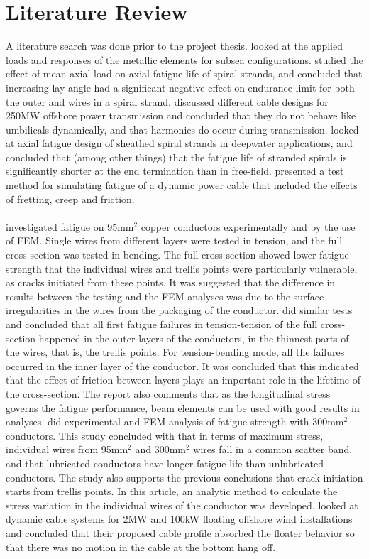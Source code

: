 \section{Literature Review}
A literature search was done prior to the project thesis. \cite{Feld1995} looked at the applied loads and responses of the metallic elements for subsea configurations. \cite{Alani1997Eoma} studied the effect of mean axial load on axial fatigue life of spiral strands, and concluded that increasing lay angle had a significant negative effect on endurance limit for both the outer and wires in a spiral strand. \cite{Chien2004} discussed different cable designs for 250MW offshore power transmission and concluded that they do not behave like umbilicals dynamically, and that harmonics do occur during transmission. \cite{Raoof2008} looked at axial fatigue design of sheathed spiral strands in deepwater applications, and concluded that (among other things) that the fatigue life of stranded spirals is significantly shorter at the end termination than in free-field. \cite{Karlsen2010} presented a test method for simulating fatigue of a dynamic power cable that included the effects of fretting, creep and friction.\\\\ \cite{Nasution2013} investigated fatigue on 95mm$^2$ copper conductors experimentally and by the use of FEM. Single wires from different layers were tested in tension, and the full cross-section was tested in bending. The full cross-section showed lower fatigue strength that the individual wires and trellis points were particularly vulnerable, as cracks initiated from these points. It was suggested that the difference in results between the testing and the FEM analyses was due to the surface irregularities in the wires from the packaging of the conductor. \cite{NASUTION2014} did similar tests and concluded that all first fatigue failures in tension-tension of the full cross-section happened in the outer layers of the conductors, in the thinnest parts of the wires, that is, the trellis points. For tension-bending mode, all the failures occurred in the inner layer of the conductor. It was concluded that this indicated that the effect of friction between layers plays an important role in the lifetime of the cross-section. The report also comments that as the longitudinal stress governs the fatigue performance, beam elements can be used with good results in analyses. \cite{s300} did experimental and FEM analysis of fatigue strength with 300mm$^2$ conductors. This study concluded with that in terms of maximum stress, individual wires from 95mm$^2$  and 300mm$^2$ wires fall in a common scatter band, and that lubricated conductors have longer fatigue life than unlubricated conductors. The study also supports the previous conclusions that crack initiation starts from trellis points. In this article, an analytic method to calculate the stress variation in the individual wires of the conductor was developed. \cite{Taninok2017} looked at dynamic cable systems for 2MW and 100kW floating offshore wind installations and concluded that their proposed cable profile absorbed the floater behavior so that there was no motion in the cable at the bottom hang off.  

